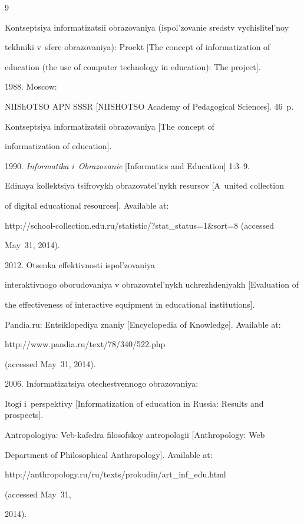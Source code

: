 {\small\frenchspacing


{%




\begin{thebibliography}{9}




     Kontseptsiya informatizatsii obrazovaniya (ispol'zovanie sredstv vychislitel'noy


tekhniki v~sfere obrazovaniya): Proekt   [The concept of informatization of


education (the use of computer technology in education): The project].


1988. Moscow:


NIIShOTSO APN SSSR [NIISHOTSO Academy of Pedagogical Sciences]. 46~p.




     Kontseptsiya informatizatsii obrazovaniya [The concept of


informatization of education].


 1990. \textit{Informatika i~Obrazovanie} [Informatics and Education] 1:3--9.




     Edinaya kollektsiya tsifrovykh obrazovatel'nykh resursov [A~united collection


of digital educational resources]. Available at:


     {\sf http://school-collection.edu.ru/\linebreak statistic/?stat\_status=1\&sort=8} (accessed


May~31, 2014).




      2012. Otsenka effektivnosti ispol'zovaniya


interaktivnogo oborudovaniya v obrazovatel'nykh uchrezhdeniyakh [Evaluation of


the effectiveness of interactive equipment in educational institutions].


Pandia.ru: Entsiklopediya znaniy [Encyclopedia of Knowledge]. Available at: {\sf


http://www.pandia.ru/text/78/340/522.php} (accessed May~31, 2014).




      2006. Informatizatsiya otechestvennogo obrazovaniya:


Itogi i~perspektivy [Informatization of education in Russia: Results and prospects].


Antropologiya: Veb-kafedra filosofskoy antropologii [Anthropology: Web


Department of Philosophical Anthropology]. Available at: {\sf


http://anthropology.ru/ru/texts/prokudin/art\_inf\_edu.html} (accessed May~31,


2014).


\end{thebibliography}


} }
